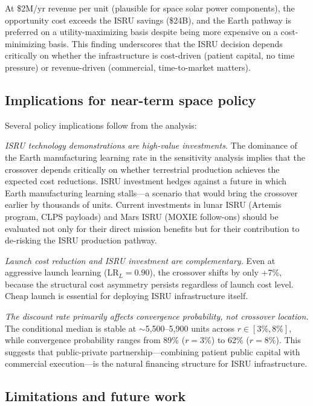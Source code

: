 \documentclass[preprint,12pt]{elsarticle}
\begin{document}
At \$2M/yr revenue per unit (plausible for space solar power components), the opportunity cost exceeds the ISRU savings (\$24B), and the Earth pathway is preferred on a utility-maximizing basis despite being more expensive on a cost-minimizing basis. This finding underscores that the ISRU decision depends critically on whether the infrastructure is cost-driven (patient capital, no time pressure) or revenue-driven (commercial, time-to-market matters).

\subsection{Implications for near-term space policy}

Several policy implications follow from the analysis:

\emph{ISRU technology demonstrations are high-value investments.} The dominance of the Earth manufacturing learning rate in the sensitivity analysis implies that the crossover depends critically on whether terrestrial production achieves the expected cost reductions. ISRU investment hedges against a future in which Earth manufacturing learning stalls---a scenario that would bring the crossover earlier by thousands of units. Current investments in lunar ISRU (Artemis program, CLPS payloads) and Mars ISRU (MOXIE follow-ons) should be evaluated not only for their direct mission benefits but for their contribution to de-risking the ISRU production pathway.

\emph{Launch cost reduction and ISRU investment are complementary.} Even at aggressive launch learning ($\mathrm{LR}_L = 0.90$), the crossover shifts by only $+$7\%, because the structural cost asymmetry persists regardless of launch cost level. Cheap launch is essential for deploying ISRU infrastructure itself.

\emph{The discount rate primarily affects convergence probability, not crossover location.} The conditional median is stable at $\sim$5{,}500--5{,}900 units across $r \in [3\%, 8\%]$, while convergence probability ranges from 89\% ($r = 3\%$) to 62\% ($r = 8\%$). This suggests that public-private partnership---combining patient public capital with commercial execution---is the natural financing structure for ISRU infrastructure.

\subsection{Limitations and future work}
\end{document}

